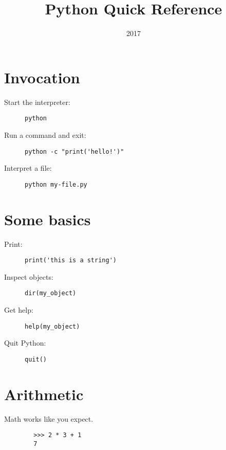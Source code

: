 \documentclass[a4paper]{tufte-handout}
\title{Python Quick Reference}
\date{2017}
\newenvironment{abjadbookoutput}{}{}
\begin{document}
\maketitle

\section{Invocation}

\begin{description}
    \item [Start the interpreter:]
        \hfill \verb|python|
    \item [Run a command and exit:]
        \hfill \verb|python -c "print('hello!')"|
    \item [Interpret a file:]
        \hfill \verb|python my-file.py|
\end{description}

\section{Some basics}

\begin{description}
    \item [Print:]
        \hfill \verb|print('this is a string')|
    \item [Inspect objects:]
        \hfill \verb|dir(my_object)|
    \item [Get help:]
        \hfill \verb|help(my_object)|
    \item [Quit Python:]
        \hfill \verb|quit()|
\end{description}

\section{Arithmetic}

    \begin{multicols}{2}

        Math works like you expect.

        \begin{comment}
        <abjad>
        2 * 3 + 1
        </abjad>
        \end{comment}

        \begin{abjadbookoutput}
        \hfill
        \begin{verbatim}
        >>> 2 * 3 + 1
        7
        \end{verbatim}
        \end{abjadbookoutput}

    \end{multicols}
\end{document}
